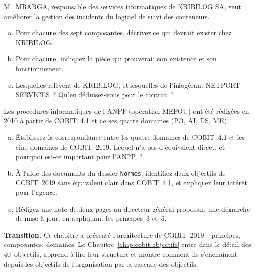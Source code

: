 \begin{boxexo}[title={\ding{45}\quad Exercice~5.2. Les composantes chez KRIBILOG \niveaumoyen}]
M.~MBARGA, responsable des services informatiques de KRIBILOG SA, veut
améliorer la gestion des incidents du logiciel de suivi des conteneurs.
\begin{enumerate}[(a)]
    \item Pour chacune des sept composantes, décrivez ce qui devrait
          exister chez KRIBILOG.
    \item Pour chacune, indiquez la pièce qui prouverait son existence et
          son fonctionnement.
    \item Lesquelles relèvent de KRIBILOG, et lesquelles de l'infogérant
          NETPORT SERVICES~? Qu'en déduisez-vous pour le contrat~?
\end{enumerate}
\end{boxexo}

\begin{boxexo}[title={\ding{45}\quad Exercice~5.3. De COBIT 4.1 à COBIT 2019 à l'ANPP \niveauexpert}]
Les procédures informatiques de l'ANPP (opération MEFOU) ont été rédigées
en 2010 à partir de COBIT~4.1 et de ses quatre domaines (PO, AI, DS, ME).
\begin{enumerate}[(a)]
    \item Établissez la correspondance entre les quatre domaines de
          COBIT~4.1 et les cinq domaines de COBIT~2019. Lequel n'a pas
          d'équivalent direct, et pourquoi est-ce important pour l'ANPP~?
    \item À l'aide des documents du dossier \texttt{Normes}, identifiez
          deux objectifs de COBIT~2019 sans équivalent clair dans
          COBIT~4.1, et expliquez leur intérêt pour l'agence.
    \item Rédigez une note de deux pages au directeur général proposant
          une démarche de mise à jour, en appliquant les principes~3 et~5.
\end{enumerate}
\end{boxexo}

\bigskip

\begin{boxinfo}
\textbf{Transition.} Ce chapitre a présenté l'architecture de COBIT~2019~:
principes, composantes, domaines. Le Chapitre~\ref{chap:cobit-objectifs}
entre dans le détail des 40~objectifs, apprend à lire leur structure et
montre comment ils s'enchaînent depuis les objectifs de l'organisation
par la cascade des objectifs.
\end{boxinfo}
